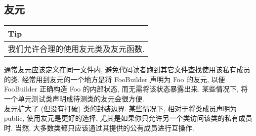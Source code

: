 \documentclass[a4paper,11pt,CJK]{article}
\begin{document}
\begin{CJK}{UTF8}{gbsn}
\subsection{友元}
\begin{table}[htbp]
\flushleft
\begin{tabular}{p{400pt}}
\toprule
\rowcolor[gray]{.8} Tip \\
\midrule
我们允许合理的使用友元类及友元函数.\\
\bottomrule
\end{tabular}
\end{table}
通常友元应该定义在同一文件内, 避免代码读者跑到其它文件查找使用该私有成员的类. 经常用到友元的一个地方是将 FooBuilder 声明为 Foo 的友元, 以便 FooBuilder 正确构造 Foo 的内部状态, 而无需将该状态暴露出来. 某些情况下, 将一个单元测试类声明成待测类的友元会很方便.\\
\indent 友元扩大了 (但没有打破) 类的封装边界. 某些情况下, 相对于将类成员声明为 public, 使用友元是更好的选择, 尤其是如果你只允许另一个类访问该类的私有成员时. 当然, 大多数类都只应该通过其提供的公有成员进行互操作.


\end{CJK}
\end{document}
